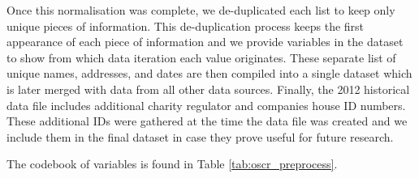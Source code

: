 \documentclass{article}
\begin{document}
Once this normalisation was complete, we de-duplicated each list to keep only unique pieces of
information.   This   de-duplication   process   keeps   the   first   appearance   of   each   piece   of
information and we provide variables in the dataset to show from which data iteration each
value originates. These separate list of unique names, addresses, and dates are then compiled
into a single dataset which is later merged with data from all other data sources.
Finally, the 2012 historical data file includes additional charity regulator and companies house
ID numbers. These additional IDs were gathered at the time the data file was created and we
include them in the final dataset in case they prove useful for future research.

The codebook of variables is found in Table \ref{tab:oscr_preprocess}.
\end{document}

